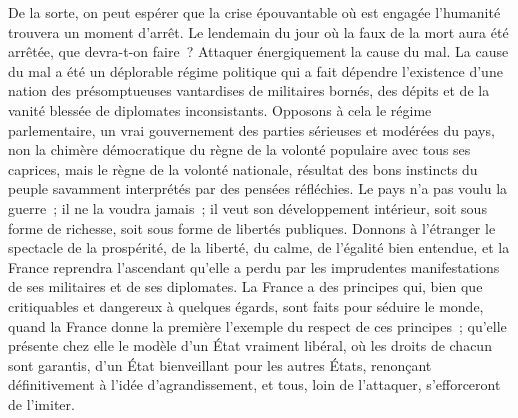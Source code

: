 \documentclass[french,twoside]{book} %
\begin{document}
De la sorte, on peut espérer que la crise épouvantable où est engagée l’humanité trouvera un moment d’arrêt. Le lendemain du jour où la faux de la mort aura été arrêtée, que devra-t-on faire ? Attaquer énergiquement la cause du mal. La cause du mal a été un déplorable régime politique qui a fait dépendre l’existence d’une nation des présomptueuses vantardises de militaires bornés, des dépits et de la vanité blessée de diplomates inconsistants. Opposons à cela le régime parlementaire, un vrai gouvernement des parties sérieuses et modérées du pays, non la chimère démocratique du règne de la volonté populaire avec tous ses caprices, mais le règne de la volonté nationale, résultat des bons instincts du peuple savamment interprétés par des pensées réfléchies. Le pays n’a pas voulu la guerre ; il ne la voudra jamais ; il veut son développement intérieur, soit sous forme de richesse, soit sous forme de libertés publiques. Donnons à l’étranger le spectacle de la prospérité, de la liberté, du calme, de l’égalité bien entendue, et la France reprendra l’ascendant qu’elle a perdu par les imprudentes manifestations de ses militaires et de ses diplomates. La France a des principes qui, bien que critiquables et dangereux à quelques égards, sont faits pour séduire le monde, quand la France donne la première l’exemple du respect de ces principes ; qu’elle présente chez elle le modèle d’un État vraiment libéral, où les droits de chacun sont garantis, d’un État bienveillant pour les autres États, renonçant définitivement à l’idée d’agrandissement, et tous, loin de l’attaquer, s’efforceront de l’imiter.\par
\end{document}
